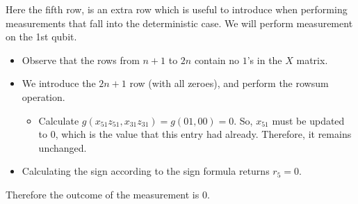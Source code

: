 \begin{example}
	Here the fifth row, is an extra row which is useful to introduce when performing measurements that fall into the deterministic case. We will perform measurement on the 1st qubit. 
	
	\begin{itemize}
		\item Observe that the rows from $n+1$ to $2n$ contain no $1$'s in the $X$ matrix. %
		\item We introduce the $2n+1$ row (with all zeroes), and perform the rowsum operation.
		\begin{itemize}
			\item Calculate $g(x_{51}z_{51},x_{31}z_{31}) = g(0 1 , 0 0 ) = 0$. So, $x_{51}$ must be updated to 0, which is the value that this entry had already. Therefore, it remains unchanged.
		\end{itemize}
		\item Calculating the sign according to the sign formula returns $r_{5} = 0$.
	\end{itemize}
	
	Therefore the outcome of the measurement is 0.
	
\end{example}




